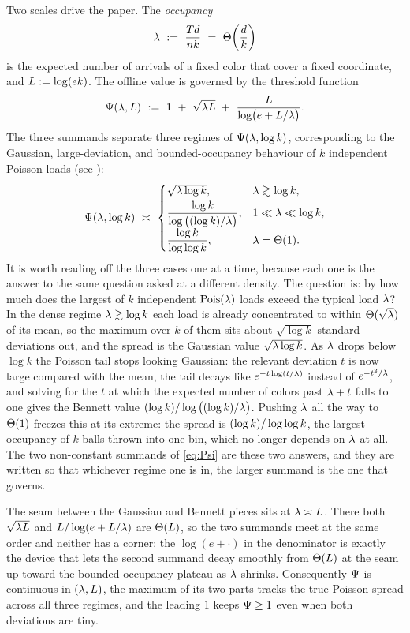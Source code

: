 Two scales drive the paper. The \emph{occupancy}
\[
  \lam\ :=\ \frac{Td}{nk}\ =\ \Th\!\left(\frac{d}{k}\right)
\]
is the expected number of arrivals of a fixed color that cover a fixed coordinate, and
$L:=\log(ek)$. The offline value is governed by the threshold function
\begin{equation}\label{eq:Psi}
  \Psifn(\lam,\Lscale)\ :=\ 1\ +\ \sqrt{\lam\Lscale}\ +\ \frac{\Lscale}{\log\!\big(e+\Lscale/\lam\big)}.
\end{equation}
The three summands separate three regimes of $\Psi(\lambda,\log k)$, corresponding to the Gaussian, large-deviation,
and bounded-occupancy behaviour of $k$ independent Poisson loads (see ):
\begin{equation}\label{eq:Psi-regimes}
  \Psi(\lambda,\log k)\ \asymp\
  \begin{cases}
    \sqrt{\lambda\log k}, & \lambda\gtrsim\log k,\\[2pt]
    \dfrac{\log k}{\log\big((\log k)/\lambda\big)}, & 1\ll\lambda\ll\log k,\\[6pt]
    \dfrac{\log k}{\log\log k}, & \lambda=\Theta(1).
  \end{cases}
\end{equation}
It is worth reading off the three cases one at a time, because each one is the answer to the same question asked at a
different density. The question is: by how much does the largest of $k$ independent $\mathrm{Pois}(\lambda)$ loads exceed the typical
load $\lambda$? In the dense regime $\lambda\gtrsim\log k$ each load is already concentrated to within $\Theta(\sqrt{\lambda})$ of its
mean, so the maximum over $k$ of them sits about $\sqrt{\log k}$ standard deviations out, and the spread is the Gaussian
value $\sqrt{\lambda\log k}$. As $\lambda$ drops below $\log k$ the Poisson tail stops looking Gaussian: the relevant deviation
$t$ is now large compared with the mean, the tail decays like $e^{-t\log(t/\lambda)}$ instead of $e^{-t^2/\lambda}$, and solving
for the $t$ at which the expected number of colors past $\lambda+t$ falls to one gives the Bennett value
$(\log k)/\log\big((\log k)/\lambda\big)$. Pushing $\lambda$ all the way to $\Theta(1)$ freezes this at its extreme: the spread is
$(\log k)/\log\log k$, the largest occupancy of $k$ balls thrown into one bin, which no longer depends on $\lambda$ at all.
The two non-constant summands of \eqref{eq:Psi} are these two answers, and they are written so that whichever regime one is
in, the larger summand is the one that governs.

The seam between the Gaussian and Bennett pieces sits at $\lambda\asymp L$. There both $\sqrt{\lambda L}$ and
$L/\log(e+L/\lambda)$ are $\Theta(L)$, so the two summands meet at the same order and neither has a corner: the
$\log(e+\cdot)$ in the denominator is exactly the device that lets the second summand decay smoothly from $\Theta(L)$ at
the seam up toward the bounded-occupancy plateau as $\lambda$ shrinks. Consequently $\Psi$ is continuous in $(\lambda,L)$,
the maximum of its two parts tracks the true Poisson spread across all three regimes, and the leading $1$ keeps $\Psi\ge1$
even when both deviations are tiny.

